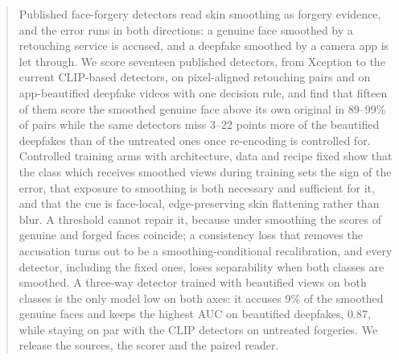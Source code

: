 \documentclass[conference]{IEEEtran}
\begin{document}
\begin{abstract}
Published face-forgery detectors read skin smoothing as forgery evidence, and the error runs in both directions: a genuine
face smoothed by a retouching service is accused, and a deepfake smoothed by a camera app is let through. We score seventeen
published detectors, from Xception to the current CLIP-based detectors, on pixel-aligned retouching pairs and on
app-beautified deepfake videos with one decision rule, and find that fifteen of them score the smoothed genuine face above
its own original in 89--99\% of pairs
while the same detectors miss 3--22 points more of the beautified deepfakes than of the untreated ones once re-encoding is
controlled for.
Controlled training arms with architecture, data and recipe fixed show that the class which receives smoothed views during
training sets the sign of the error, that exposure to smoothing is both necessary and sufficient for it, and that the cue is
face-local, edge-preserving skin flattening rather than blur. A threshold cannot repair it, because under smoothing the
scores of genuine and forged faces coincide; a consistency loss that removes the accusation turns out to be a
smoothing-conditional recalibration, and every detector, including the fixed ones, loses separability when both classes are
smoothed. A three-way detector trained with beautified views on both classes is the only model low on both axes: it accuses
9\% of the smoothed genuine faces
and keeps the highest AUC on beautified deepfakes, 0.87,
while staying on par with the CLIP detectors on untreated forgeries. We release the sources, the scorer and the paired reader.
\end{abstract}

\end{document}
